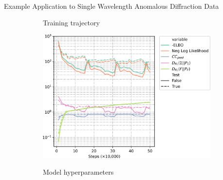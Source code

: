 \documentclass[final]{beamer}
\newlength{\colwidth}
\begin{document}
\begin{frame}[t]
\begin{columns}[t]
\begin{column}{\colwidth}
\begin{block}{Example Application to Single Wavelength Anomalous Diffraction Data}
  \begin{figure}[]
    \centering
    \begin{subfigure}[c]{0.60\textwidth}
      \centering
      Training trajectory\bigskip
      
      \includegraphics[width=\textwidth]{figures/thermolysin/trajectory_trimmed.png}
    \end{subfigure}\hfill
    \begin{subfigure}[c]{0.35\textwidth}
      \centering
      Model hyperparameters\bigskip


\end{subfigure}
\end{figure}
\end{block}
\end{column}
\end{columns}
\end{frame}
\end{document}
